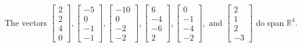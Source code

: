 \begin{exercise}
\begin{exerciseStatement}
  \end{exerciseStatement}
  \begin{exerciseAnswer}
   The vectors \(\left[\begin{array}{r}
2 \\
2 \\
4 \\
0
\end{array}\right] , \left[\begin{array}{r}
-5 \\
0 \\
-1 \\
-1
\end{array}\right] , \left[\begin{array}{r}
-10 \\
0 \\
-2 \\
-2
\end{array}\right] , \left[\begin{array}{r}
6 \\
-4 \\
-6 \\
2
\end{array}\right] , \left[\begin{array}{r}
0 \\
-1 \\
-4 \\
-2
\end{array}\right] , \text{ and } \left[\begin{array}{r}
2 \\
1 \\
2 \\
-3
\end{array}\right]\) 
  	 do  
	span \(\mathbb{R}^4\).
  


  \end{exerciseAnswer}
\end{exercise}
